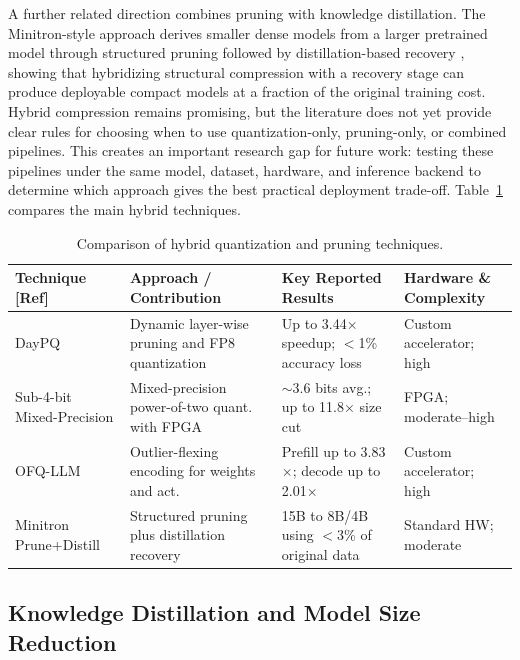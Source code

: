 \documentclass[
11pt, %
english, %
singlespacing, %
headsepline, %
]{MastersDoctoralThesis} %
\begin{document}
A further related direction combines pruning with knowledge distillation. The Minitron-style approach derives smaller dense models from a larger pretrained model through structured pruning followed by distillation-based recovery \cite{muralidharan2024minitron}, showing that hybridizing structural compression with a recovery stage can produce deployable compact models at a fraction of the original training cost. Hybrid compression remains promising, but the literature does not yet provide clear rules for choosing when to use quantization-only, pruning-only, or combined pipelines. This creates an important research gap for future work: testing these pipelines under the same model, dataset, hardware, and inference backend to determine which approach gives the best practical deployment trade-off. Table~\ref{tab:lr-hybrid} compares the main hybrid techniques.

\begin{table}[htbp]
\centering
\scriptsize
\caption{Comparison of hybrid quantization and pruning techniques.}
\label{tab:lr-hybrid}
\renewcommand{\arraystretch}{1.2}
\begin{tabular}{p{}p{}p{}p{}}
\hline
\textbf{Technique [Ref]} & \textbf{Approach / Contribution} & \textbf{Key Reported Results} & \textbf{Hardware \& Complexity} \\
\hline
DayPQ \cite{xu2026daypq} & Dynamic layer-wise pruning and FP8 quantization & Up to 3.44$\times$ speedup; $<$1\% accuracy loss & Custom accelerator; high \\
Sub-4-bit Mixed-Precision \cite{cho2025sub4bit} & Mixed-precision power-of-two quant. with FPGA & $\sim$3.6 bits avg.; up to 11.8$\times$ size cut & FPGA; moderate--high \\
OFQ-LLM \cite{wang2025ofqllm} & Outlier-flexing encoding for weights and act. & Prefill up to 3.83$\times$; decode up to 2.01$\times$ & Custom accelerator; high \\
Minitron Prune+Distill \cite{muralidharan2024minitron} & Structured pruning plus distillation recovery & 15B to 8B/4B using $<$3\% of original data & Standard HW; moderate \\
\hline
\end{tabular}
\end{table}

\subsection{Knowledge Distillation and Model Size Reduction}
\end{document}
